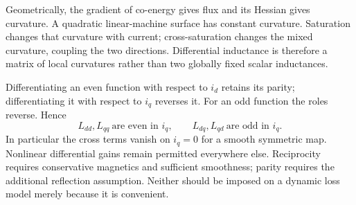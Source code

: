 Geometrically, the gradient of co-energy gives flux and its Hessian gives
curvature. A quadratic linear-machine surface has constant curvature.
Saturation changes that curvature with current; cross-saturation changes
the mixed curvature, coupling the two directions. Differential inductance
is therefore a matrix of local curvatures rather than two globally fixed
scalar inductances.

Differentiating an even function with respect to $i_d$ retains its parity;
differentiating it with respect to $i_q$ reverses it. For an odd function the
roles reverse. Hence
\begin{equation}
 L_{dd},L_{qq}\ \text{are even in }i_q,\qquad
 L_{dq},L_{qd}\ \text{are odd in }i_q.\label{eq:inductance-parities}
\end{equation}
In particular the cross terms vanish on $i_q=0$ for a smooth symmetric map.
Nonlinear differential gains remain permitted everywhere else. Reciprocity
requires conservative magnetics and sufficient smoothness; parity requires
the additional reflection assumption. Neither should be imposed on a
dynamic loss model merely because it is convenient.
